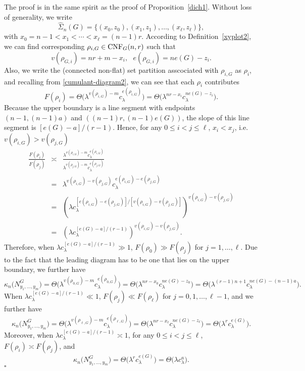 \documentclass[12pt]{article}
\newenvironment{Proof}{\removelastskip\par\medskip
\noindent{\em Proof.} \rm}{\penalty-20\null\hfill$\square$\par\medbreak}
\numberwithin{equation}{section}
\begin{document}
\begin{Proof}
The proof is in the same spirit as the proof of Proposition~\ref{dich1}. Without loss of generality, we write 
$$
\widehat{\Sigma}_n(G)=\{(x_0,z_0),(x_1,z_1),\dots,(x_\ell,z_\ell)\},
$$
with $x_0=n-1<x_1<\cdots<x_\ell=(n-1)r.$ 
According to Definition~\ref{xyplot2}, we can find corresponding $\rho_{i,G}\in{\rm CNF}_G(n,r)$ such that 
$$
v(\rho_{G,i})=nr+m-x_i,~~~e(\rho_{G,i})=ne(G)-z_i.
$$
Also, we write the (connected non-flat) set partition asscociated with $\rho_{i,G}$ as $\rho_i$, and recalling from \eqref{cumulant-diagram2}, we can see that each $\rho_i$ contributes 
\begin{equation}
  F(\rho_i)=\Theta\big(\lambda^{v(\rho_{i,G})-m}c_\lambda^{e(\rho_{i,G})}\big)=\Theta\big(\lambda^{nr-x_i}c_\lambda^{ne(G)-z_i}\big).
\end{equation}
Because the upper boundary is a line segment with endpoints $(n-1,(n-1)a)$ and $((n-1)r,(n-1)e(G))$, the slope of this line segment is $[e(G)-a]/(r-1)$. Hence, for any $0\le i<j\le \ell$, $x_i<x_j$, i.e. $v(\rho_{i,G})>v(\rho_{j,G})$
\begin{eqnarray*}
  \frac{F(\rho_i)}{F(\rho_j)}&\asymp&\frac{\lambda^{v(\rho_{i,G})-m}c_\lambda^{e(\rho_{i,G})}}{\lambda^{v(\rho_{j,G})-m}c_\lambda^{e(\rho_{j,G})}}\\
  &=&\lambda^{v(\rho_{i,G})-v(\rho_{j,G})}c_\lambda^{e(\rho_{i,G})-e(\rho_{j,G})}\\
  &=&\left(\lambda c_\lambda^{[e(\rho_{i,G})-e(\rho_{j,G})]/[v(\rho_{i,G})-v(\rho_{j,G})]}\right)^{v(\rho_{i,G})-v(\rho_{j,G})}\\
  &=&\left(\lambda c_\lambda^{[e(G)-a]/(r-1)}\right)^{v(\rho_{i,G})-v(\rho_{j,G})}.
\end{eqnarray*}
Therefore, when $\lambda c_\lambda^{[e(G)-a]/ ( r-1 )}\gg1$, $F(\rho_0)\gg F(\rho_j)$ for $j=1,\dots,\ell$. Due to the fact that the leading diagram has to be one that lies on the upper boundary, we further have
\begin{equation}
  \kappa_n\big(N_{y_1,\ldots , y_m}^G\big)=\Theta\big(\lambda^{v(\rho_{0,G})-m}c_\lambda^{e(\rho_{0,G})}\big)=\Theta\big(\lambda^{nr-x_0}c_\lambda^{ne(G)-z_0}\big)=\Theta\big(\lambda^{(r-1)n+1}c_\lambda^{ne(G)-(n-1)a}\big).
\end{equation}
When $\lambda c_\lambda^{[e(G)-a]/ ( r-1 )}\ll1$, $F(\rho_j)\ll F(\rho_\ell)$ for $j=0,1,\dots, \ell-1$, and we further have
\begin{equation}
  \kappa_n\big(N_{y_1,\ldots , y_m}^G\big)=\Theta\big(\lambda^{v(\rho_{\ell,G})-m}c_\lambda^{e(\rho_{\ell,G})}\big)=\Theta\big(\lambda^{nr-x_\ell}c_\lambda^{ne(G)-z_\ell}\big)=\Theta\big(\lambda^{r}c_\lambda^{e(G)}\big).
\end{equation}
Moreover, when $\lambda c_\lambda^{[e(G)-a]/ ( r-1 )}\asymp1$, for any $0\le i<j\le \ell$, $F(\rho_i)\asymp F(\rho_j)$, and 
\begin{equation}
  \kappa_n\big(N_{y_1,\ldots , y_m}^G\big)=\Theta\big(\lambda^{r}c_\lambda^{e(G)}\big)=\Theta\big(\lambda c_\lambda^{a}\big).
\end{equation}
\end{Proof}
\end{document}
